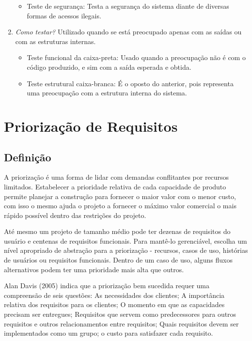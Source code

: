 \documentclass[runningheads]{llncs}
\begin{document}
\begin{enumerate}
\begin{itemize}
            \item {Teste de segurança}: Testa a segurança do sistema diante de diversas formas de acessos ilegais.
        \end{itemize}
    \item \textit{Como testar?} Utilizado quando se está preocupado apenas com as saídas ou com as estruturas internas.
        \begin{itemize}
            \item {Teste funcional da caixa-preta}: Usado quando a preocupação não é com o código produzido, e sim com a saída esperada e obtida.
            \item {Teste estrutural caixa-branca}: É o oposto do anterior, pois representa uma preocupação com a estrutura interna do sistema.
        \end{itemize}
\end{enumerate}

\section{Priorização de Requisitos}

\subsection{Definição}
A priorização é uma forma de lidar com demandas conflitantes por recursos limitados. Estabelecer a prioridade relativa de cada capacidade de produto permite planejar a construção para fornecer o maior valor com o menor custo, com isso o mesmo ajuda o projeto a fornecer o máximo valor comercial o mais rápido possível dentro das restrições do projeto.

Até mesmo um projeto de tamanho médio pode ter dezenas de requisitos do usuário e centenas de requisitos funcionais. Para mantê-lo gerenciável, escolha um nível apropriado de abstração para a priorização - recursos, casos de uso, histórias de usuários ou requisitos funcionais. Dentro de um caso de uso, alguns fluxos alternativos podem ter uma prioridade mais alta que outros.

Alan Davis (2005) indica que a priorização bem sucedida requer uma compreensão de seis questões: As necessidades dos clientes; A importância relativa dos requisitos para os clientes; O momento em que as capacidades precisam ser entregues; Requisitos que servem como predecessores para outros requisitos e outros relacionamentos entre requisitos; Quais requisitos devem ser implementados como um grupo; o custo para satisfazer cada requisito.
\end{document}
